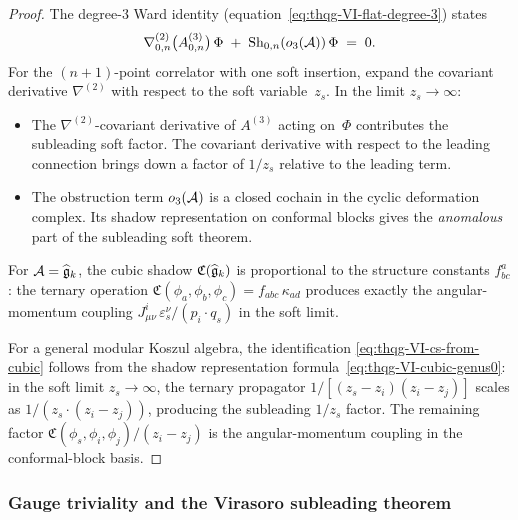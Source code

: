 \begin{proof}
The degree-$3$ Ward identity
(equation~\eqref{eq:thqg-VI-flat-degree-3}) states
\[
\nabla^{(2)}_{0,n}\bigl(A^{(3)}_{0,n}\bigr)\,\Phi
\;+\;
\operatorname{Sh}_{0,n}(o_3(\mathcal{A}))\,\Phi
\;=\; 0.
\]
For the $(n+1)$-point correlator with one soft insertion, expand the
covariant derivative $\nabla^{(2)}$ with respect to the soft
variable~$z_s$. In the limit $z_s \to \infty$:
\begin{itemize}
\item The $\nabla^{(2)}$-covariant derivative of $A^{(3)}$ acting
 on~$\Phi$ contributes the subleading soft factor. The covariant
 derivative with respect to the leading connection brings down
 a factor of $1/z_s$ relative to the leading term.
\item The obstruction term $o_3(\mathcal{A})$ is a closed cochain in the
 cyclic deformation complex. Its shadow representation on
 conformal blocks gives the \emph{anomalous} part of the
 subleading soft theorem.
\end{itemize}

For $\mathcal{A} = \widehat{\mathfrak{g}}_k$, the cubic shadow
$\mathfrak{C}(\widehat{\mathfrak{g}}_k)$ is proportional to the structure
constants $f^a_{bc}$: the ternary operation
$\mathfrak{C}(\phi_a, \phi_b, \phi_c) = f_{abc}\,\kappa_{ad}$
produces exactly the angular-momentum coupling
$J^i_{\mu\nu}\,\varepsilon_s^\nu/(p_i \cdot q_s)$ in the
soft limit.

For a general modular Koszul algebra, the identification
\eqref{eq:thqg-VI-cs-from-cubic} follows from the shadow
representation formula~\eqref{eq:thqg-VI-cubic-genus0}: in the
soft limit $z_s \to \infty$, the ternary propagator
$1/[(z_s - z_i)(z_i - z_j)]$ scales as $1/(z_s \cdot (z_i - z_j))$,
producing the subleading $1/z_s$ factor. The remaining factor
$\mathfrak{C}(\phi_s, \phi_i, \phi_j)/(z_i - z_j)$ is the
angular-momentum coupling in the conformal-block basis.
\end{proof}

\subsubsection{Gauge triviality and the Virasoro subleading theorem}

